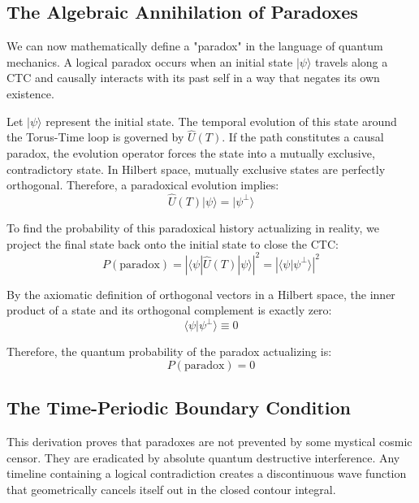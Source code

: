 \documentclass[12pt,openany]{book}
\begin{document}
\subsection{The Algebraic Annihilation of Paradoxes}
We can now mathematically define a "paradox" in the language of quantum mechanics. A logical paradox occurs when an initial state $|\psi\rangle$ travels along a CTC and causally interacts with its past self in a way that negates its own existence. 

Let $|\psi\rangle$ represent the initial state. The temporal evolution of this state around the Torus-Time loop is governed by $\hat{U}(T)$. If the path constitutes a causal paradox, the evolution operator forces the state into a mutually exclusive, contradictory state. In Hilbert space, mutually exclusive states are perfectly orthogonal. Therefore, a paradoxical evolution implies:
\begin{equation}
    \hat{U}(T) |\psi\rangle = |\psi^\perp\rangle
\end{equation}

To find the probability of this paradoxical history actualizing in reality, we project the final state back onto the initial state to close the CTC:
\begin{equation}
    P(\text{paradox}) = \left| \langle \psi | \hat{U}(T) | \psi \rangle \right|^2 = \left| \langle \psi | \psi^\perp \rangle \right|^2
\end{equation}

By the axiomatic definition of orthogonal vectors in a Hilbert space, the inner product of a state and its orthogonal complement is exactly zero:
\begin{equation}
    \langle \psi | \psi^\perp \rangle \equiv 0
\end{equation}

Therefore, the quantum probability of the paradox actualizing is:
\begin{equation}
    P(\text{paradox}) = 0
\end{equation}

\subsection{The Time-Periodic Boundary Condition}
This derivation proves that paradoxes are not prevented by some mystical cosmic censor. They are eradicated by absolute quantum destructive interference. Any timeline containing a logical contradiction creates a discontinuous wave function that geometrically cancels itself out in the closed contour integral. 
\end{document}
